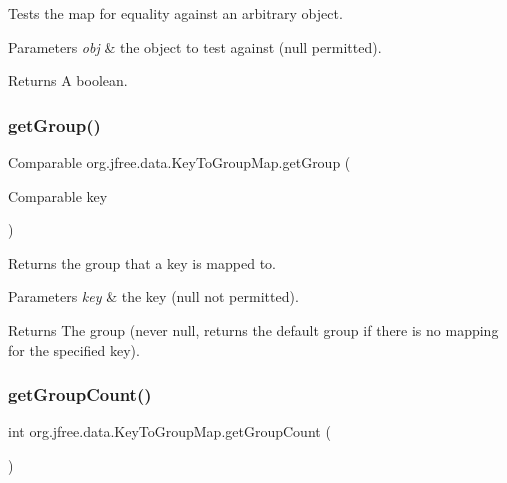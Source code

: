 Tests the map for equality against an arbitrary object.


\begin{DoxyParams}{Parameters}
{\em obj} & the object to test against ({\ttfamily null} permitted).\\
\hline
\end{DoxyParams}
\begin{DoxyReturn}{Returns}
A boolean. 
\end{DoxyReturn}
\mbox{\label{classorg_1_1jfree_1_1data_1_1_key_to_group_map_a67c6168790346b7722c8c0ea1780d24a}} 
\subsubsection{\texorpdfstring{get\+Group()}{getGroup()}}
{\footnotesize\ttfamily Comparable org.\+jfree.\+data.\+Key\+To\+Group\+Map.\+get\+Group (\begin{DoxyParamCaption}\item[{Comparable}]{key }\end{DoxyParamCaption})}

Returns the group that a key is mapped to.


\begin{DoxyParams}{Parameters}
{\em key} & the key ({\ttfamily null} not permitted).\\
\hline
\end{DoxyParams}
\begin{DoxyReturn}{Returns}
The group (never {\ttfamily null}, returns the default group if there is no mapping for the specified key). 
\end{DoxyReturn}
\mbox{\label{classorg_1_1jfree_1_1data_1_1_key_to_group_map_aec3a2769cb4d32c1fa2a80424a742410}} 
\subsubsection{\texorpdfstring{get\+Group\+Count()}{getGroupCount()}}
{\footnotesize\ttfamily int org.\+jfree.\+data.\+Key\+To\+Group\+Map.\+get\+Group\+Count (\begin{DoxyParamCaption}{ }\end{DoxyParamCaption})}

